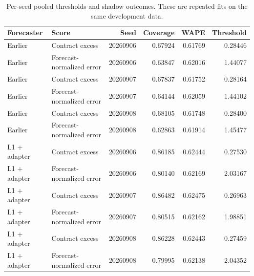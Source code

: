 \begin{table}[t]
\centering\small
\caption{Per-seed pooled thresholds and shadow outcomes. These are repeated fits on the same development data.}
\label{tab:seeds}
\begin{tabular}{llrrrr}
\toprule
Forecaster & Score & Seed & Coverage & WAPE & Threshold\\
\midrule
Earlier & Contract excess & 20260906 & 0.67924 & 0.61769 & 0.28446\\
Earlier & Forecast-normalized error & 20260906 & 0.63847 & 0.62016 & 1.44077\\
Earlier & Contract excess & 20260907 & 0.67837 & 0.61752 & 0.28164\\
Earlier & Forecast-normalized error & 20260907 & 0.64144 & 0.62059 & 1.44102\\
Earlier & Contract excess & 20260908 & 0.68105 & 0.61748 & 0.28400\\
Earlier & Forecast-normalized error & 20260908 & 0.62863 & 0.61914 & 1.45477\\
L1 + adapter & Contract excess & 20260906 & 0.86185 & 0.62444 & 0.27530\\
L1 + adapter & Forecast-normalized error & 20260906 & 0.80140 & 0.62169 & 2.03167\\
L1 + adapter & Contract excess & 20260907 & 0.86482 & 0.62475 & 0.26963\\
L1 + adapter & Forecast-normalized error & 20260907 & 0.80515 & 0.62162 & 1.98851\\
L1 + adapter & Contract excess & 20260908 & 0.86228 & 0.62443 & 0.27459\\
L1 + adapter & Forecast-normalized error & 20260908 & 0.79995 & 0.62138 & 2.04352\\
\bottomrule
\end{tabular}
\end{table}
